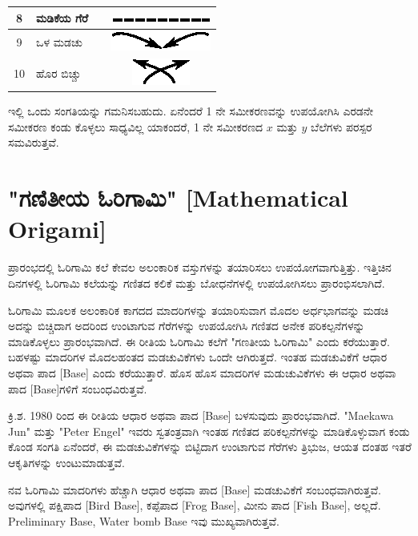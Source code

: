 \begin{longtable}[l]{|c|l|l|c|}
\hline
8 & ಮಡಿಕೆಯ ಗೆರೆ & & {\includegraphics[scale=.98]{src/figure/chap1/fig1a_8.eps}}\\
\hline
9 & ಒಳ ಮಡಚು & & {\includegraphics[scale=.98]{src/figure/chap1/fig1a_10.eps}}\\
\hline
10 & ಹೊರ ಬಿಚ್ಚು & & {\includegraphics[scale=.98]{src/figure/chap1/fig1a_11.eps}}\\
\hline
\end{longtable}

\smallskip

ಇಲ್ಲಿ ಒಂದು ಸಂಗತಿಯನ್ನು ಗಮನಿಸಬಹುದು. ಏನೆಂದರೆ 1 ನೇ ಸಮೀಕರಣವನ್ನು ಉಪಯೋಗಿಸಿ ಎರಡನೇ ಸಮೀಕರಣ ಕಂಡು ಕೊಳ್ಳಲು ಸಾಧ್ಯವಿಲ್ಲ ಯಾಕಂದರೆ, 1 ನೇ ಸಮೀಕರಣದ $x$ ಮತ್ತು $y$  ಬೆಲೆಗಳು ಪರಸ್ಪರ ಸಮವಿರುತ್ತವೆ. 


\section*{"ಗಣಿತೀಯ ಓರಿಗಾಮಿ" [Mathematical Origami]}
ಪ್ರಾರಂಭದಲ್ಲಿ ಓರಿಗಾಮಿ ಕಲೆ ಕೇವಲ ಅಲಂಕಾರಿಕ ವಸ್ತುಗಳನ್ನು ತಯಾರಿಸಲು ಉಪಯೋಗವಾಗುತ್ತಿತ್ತು. ಇತ್ತಿಚಿನ ದಿನಗಳಲ್ಲಿ ಓರಿಗಾಮಿ ಕಲೆಯನ್ನು ಗಣಿತದ ಕಲಿಕೆ ಮತ್ತು ಬೋಧನೆಗಳಲ್ಲಿ ಉಪಯೋಗಿಸಲು ಪ್ರಾರಂಭಿಸಲಾಗಿದೆ. 

ಓರಿಗಾಮಿ ಮೂಲಕ ಅಲಂಕಾರಿಕ ಕಾಗದದ ಮಾದರಿಗಳನ್ನು ತಯಾರಿಸುವಾಗ ಮೊದಲ ಅರ್ಧಭಾಗವನ್ನು ಮಡಚಿ ಅದನ್ನು ಬಿಚ್ಚಿದಾಗ ಅದರಿಂದ ಉಂಟಾಗುವ ಗೆರೆಗಳನ್ನು ಉಪಯೋಗಿಸಿ ಗಣಿತದ ಅನೇಕ ಪರಿಕಲ್ಪನೆಗಳನ್ನು ಮಾಡಿಕೊಳ್ಳಲು ಪ್ರಾರಂಭವಾಗಿದೆ. ಈ ರೀತಿಯ ಓರಿಗಾಮಿ ಕಲೆಗೆ "ಗಣತೀಯ ಓರಿಗಾಮಿ" ಎಂದು ಕರೆಯುತ್ತಾರೆ. ಬಹಳಷ್ಟು ಮಾದರಿಗಳ ಮೊದಲಹಂತದ ಮಡಚುವಿಕೆಗಳು ಒಂದೇ ಆಗಿರುತ್ತದೆ. ಇಂತಹ ಮಡಚುವಿಕೆಗೆ ಆಧಾರ ಅಥವಾ ಪಾದ [Base] ಎಂದು ಕರೆಯುತ್ತಾರೆ. ಹೊಸ ಹೊಸ ಮಾದರಿಗಳ ಮಡುಚುವಿಕೆಗಳು ಈ ಆಧಾರ ಅಥವಾ ಪಾದ [Base]ಗಳಿಗೆ ಸಂಬಂಧವಿರುತ್ತವೆ.

ಕ್ರಿ.ಶ. 1980 ರಿಂದ ಈ ರೀತಿಯ ಆಧಾರ ಅಥವಾ ಪಾದ [Base] ಬಳಸುವುದು ಪ್ರಾರಂಭವಾಗಿದೆ. "Maekawa Jun" ಮತ್ತು "Peter Engel" ಇವರು ಸ್ವತಂತ್ರವಾಗಿ ಇಂತಹ ಗಣಿತದ ಪರಿಕಲ್ಪನೆಗಳನ್ನು ಮಾಡಿಕೊಳ್ಳುವಾಗ ಕಂಡು ಕೊಂಡ ಸಂಗತಿ ಏನೆಂದರೆ, ಈ ಮಡಚುವಿಕೆಗಳನ್ನು ಬಿಟ್ಟಿದಾಗ ಉಂಟಾಗುವ ಗೆರೆಗಳು ತ್ರಿಭುಜ, ಆಯತ ದಂತಹ ಇತರೆ ಆಕೃತಿಗಳನ್ನು ಉಂಟುಮಾಡುತ್ತವೆ. 

ನವ ಓರಿಗಾಮಿ ಮಾದರಿಗಳು ಹೆಚ್ಚಾಗಿ ಆಧಾರ ಅಥವಾ ಪಾದ [Base] ಮಡಚುವಿಕೆಗೆ ಸಂಬಂಧವಾಗಿರುತ್ತವೆ. ಅವುಗಳಲ್ಲಿ ಪಕ್ಷಿಪಾದ [Bird Base], ಕಪ್ಪೆಪಾದ [Frog Base], ಮೀನು ಪಾದ [Fish Base], ಅಲ್ಲದೆ. Preliminary Base, Water bomb Base ಇವು ಮುಖ್ಯವಾಗಿರುತ್ತವೆ. 

